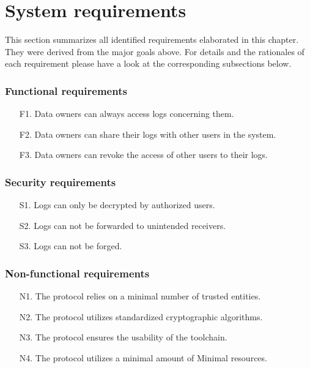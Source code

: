 \documentclass[../main.tex]{subfiles}
\begin{document}
\section{System requirements}\label{system-requriements}
This section summarizes all identified requirements elaborated in this chapter.
They were derived from the major goals above.
For details and the rationales of each requirement please have a look at the corresponding subsections below.

\subsubsection{Functional requirements}
\begin{itemize}
    \item [F1.] Data owners can always access logs concerning them.
    \item [F2.] Data owners can share their logs with other users in the system.
    \item [F3.] Data owners can revoke the access of other users to their logs.
\end{itemize}

\subsubsection{Security requirements}
\begin{itemize}
    \item [S1.] Logs can only be decrypted by authorized users.
    \item [S2.] Logs can not be forwarded to unintended receivers.
    \item [S3.] Logs can not be forged.
\end{itemize}

\subsubsection{Non-functional requirements}
\begin{itemize}
    \item [N1.] The protocol relies on a minimal number of trusted entities.
    \item [N2.] The protocol utilizes standardized cryptographic algorithms.
    \item [N3.] The protocol ensures the usability of the toolchain.
    \item [N4.] The protocol utilizes a minimal amount of Minimal resources.
\end{itemize}
\end{document}
